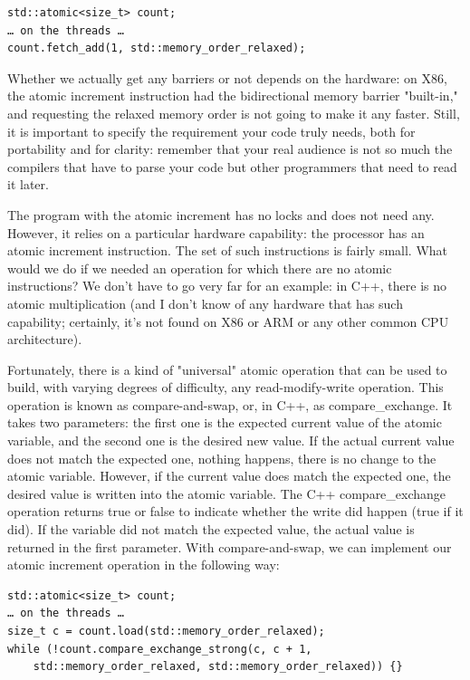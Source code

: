 \begin{lstlisting}[style=styleCXX]
std::atomic<size_t> count;
… on the threads …
count.fetch_add(1, std::memory_order_relaxed);
\end{lstlisting}

Whether we actually get any barriers or not depends on the hardware: on X86, the atomic increment instruction had the bidirectional memory barrier "built-in," and requesting the relaxed memory order is not going to make it any faster. Still, it is important to specify the requirement your code truly needs, both for portability and for clarity: remember that your real audience is not so much the compilers that have to parse your code but other programmers that need to read it later.

The program with the atomic increment has no locks and does not need any. However, it relies on a particular hardware capability: the processor has an atomic increment instruction. The set of such instructions is fairly small. What would we do if we needed an operation for which there are no atomic instructions? We don't have to go very far for an example: in C++, there is no atomic multiplication (and I don't know of any hardware that has such capability; certainly, it's not found on X86 or ARM or any other common CPU architecture).

Fortunately, there is a kind of "universal" atomic operation that can be used to build, with varying degrees of difficulty, any read-modify-write operation. This operation is known as compare-and-swap, or, in C++, as compare\_exchange. It takes two parameters: the first one is the expected current value of the atomic variable, and the second one is the desired new value. If the actual current value does not match the expected one, nothing happens, there is no change to the atomic variable. However, if the current value does match the expected one, the desired value is written into the atomic variable. The C++ compare\_exchange operation returns true or false to indicate whether the write did happen (true if it did). If the variable did not match the expected value, the actual value is returned in the first parameter. With compare-and-swap, we can implement our atomic increment operation in the following way:

\begin{lstlisting}[style=styleCXX]
std::atomic<size_t> count;
… on the threads …
size_t c = count.load(std::memory_order_relaxed);
while (!count.compare_exchange_strong(c, c + 1,
	std::memory_order_relaxed, std::memory_order_relaxed)) {}
\end{lstlisting}

